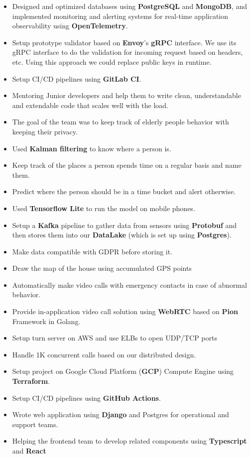 \begin{itemize}
      \item Designed and optimized databases using \textbf{PostgreSQL} and \textbf{MongoDB},
            and implemented monitoring and alerting systems for real-time application observability using \textbf{OpenTelemetry}.
      \item Setup prototype validator based on \textbf{Envoy}'s \textbf{gRPC} interface. We use its gRPC interface to do the validation for incoming request
            based on headers, etc. Using this approach we could replace public keys in runtime.
      \item Setup CI/CD pipelines using \textbf{GitLab CI}.
      \item Mentoring Junior developers and help them to write clean, understandable and extendable code that scales well with the load.
\end{itemize}

\vspace{0.5cm}

\begin{itemize}
      \item The goal of the team was to keep track of elderly people behavior with keeping their privacy.
      \item Used \textbf{Kalman filtering} to know where a person is.
      \item Keep track of the places a person spends time on a regular basis and name them.
      \item Predict where the person should be in a time bucket and alert otherwise.
      \item Used \textbf{Tensorflow Lite} to run the model on mobile phones.
      \item Setup a \textbf{Kafka} pipeline to gather data from sensors using \textbf{Protobuf} and
            then stores them into our \textbf{DataLake} (which is set up using \textbf{Postgres}).
      \item Make data compatible with GDPR before storing it.
      \item Draw the map of the house using accumulated GPS points
      \item Automatically make video calls with emergency contacts in case of abnormal behavior.
      \item Provide in-application video call solution using \textbf{WebRTC} based on \textbf{Pion} Framework in Golang.
      \item Setup turn server on AWS and use ELBs to open UDP/TCP ports
      \item Handle 1K concurrent calls based on our distributed design.
      \item Setup project on Google Cloud Platform (\textbf{GCP}) Compute Engine using \textbf{Terraform}.
      \item Setup CI/CD pipelines using \textbf{GitHub Actions}.
      \item Wrote web application using \textbf{Django} and Postgres for operational and support teams.
      \item Helping the frontend team to develop related components using \textbf{Typescript} and \textbf{React}
\end{itemize}